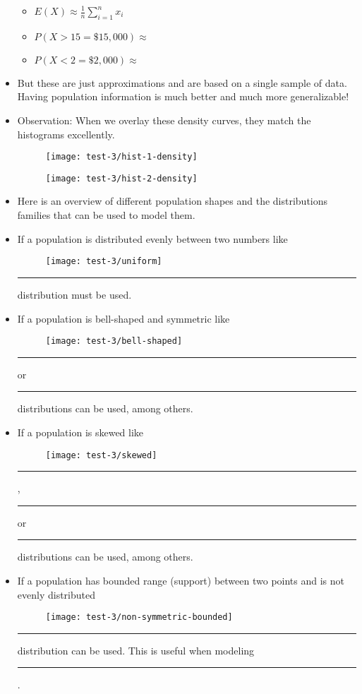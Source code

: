 \documentclass{article}
\newcommand{\blankul}[1]{\rule[-1.5mm]{#1}{0.15mm}}	%
\begin{document}
\begin{itemize}
    \begin{itemize}
        \item $\displaystyle E(X) \approx \frac{1}{n} \sum_{i = 1}^{n} x_i$\bigskip
        \item $P(X > 15 = \$15,000) \approx $\bigskip
        \item $P(X < 2 = \$2,000) \approx $\bigskip
    \end{itemize}
    \item But these are just approximations and are based on a single sample of data. Having population information is much better and much more generalizable!
    \item[] Observation: When we overlay these density curves, they match the histograms excellently.
    \begin{figure}[H]
       \begin{minipage}{0.45\textwidth}
            \center\texttt{[image: test-3/hist-1-density]}
        \end{minipage}
       \begin{minipage}{0.45\textwidth}
            \center\texttt{[image: test-3/hist-2-density]}
        \end{minipage}
    \end{figure}
    \item Here is an overview of different population shapes and the distributions families that can be used to model them.
    \item If a population is distributed evenly between two numbers like
    \begin{figure}[H]
        \center\texttt{[image: test-3/uniform]}
    \end{figure}
        \blankul{2cm} distribution must be used.\bigskip
    \item If a population is bell-shaped and symmetric like
    \begin{figure}[H]
        \center\texttt{[image: test-3/bell-shaped]}
    \end{figure}
        \blankul{2cm} or \blankul{2cm} distributions can be used, among others.\bigskip
    \item If a population is skewed like
    \begin{figure}[H]
        \center\texttt{[image: test-3/skewed]}
    \end{figure}
        \blankul{2cm}, \blankul{2cm} or \blankul{2cm} distributions can be used, among others.\bigskip
    \item If a population has bounded range (support) between two points and is not evenly distributed
    \begin{figure}[H]
        \center\texttt{[image: test-3/non-symmetric-bounded]}
    \end{figure}
        \blankul{2cm} distribution can be used. This is useful when modeling \blankul{3cm}.
\end{itemize}\bigskip
\end{document}
